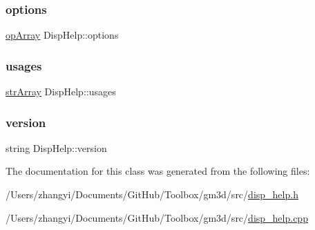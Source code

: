 \subsubsection{\texorpdfstring{options}{options}}
{\footnotesize\ttfamily \mbox{\hyperlink{disp__help_8h_a07d57c5fa50bacc9b37aa30e81a6901d}{op\+Array}} Disp\+Help\+::options\hspace{0.3cm}{\ttfamily [private]}}

\mbox{\label{class_disp_help_a1ea249205321b5864b35743d9f8b42e3}} 
\subsubsection{\texorpdfstring{usages}{usages}}
{\footnotesize\ttfamily \mbox{\hyperlink{disp__help_8h_acb0204177ba52d9ff9cd0117150d0bba}{str\+Array}} Disp\+Help\+::usages\hspace{0.3cm}{\ttfamily [private]}}

\mbox{\label{class_disp_help_adf5903b92fc438a9398d4c80f340823a}} 
\subsubsection{\texorpdfstring{version}{version}}
{\footnotesize\ttfamily string Disp\+Help\+::version\hspace{0.3cm}{\ttfamily [private]}}



The documentation for this class was generated from the following files\+:\begin{DoxyCompactItemize}
\item 
/\+Users/zhangyi/\+Documents/\+Git\+Hub/\+Toolbox/gm3d/src/\mbox{\hyperlink{disp__help_8h}{disp\+\_\+help.\+h}}\item 
/\+Users/zhangyi/\+Documents/\+Git\+Hub/\+Toolbox/gm3d/src/\mbox{\hyperlink{disp__help_8cpp}{disp\+\_\+help.\+cpp}}\end{DoxyCompactItemize}
